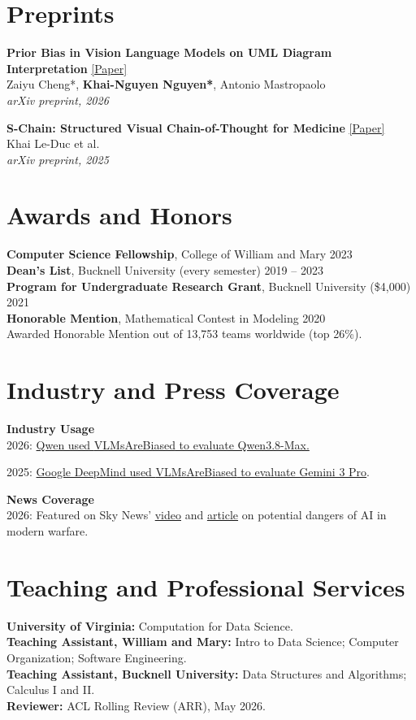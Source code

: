 \documentclass[11pt,a4paper]{article}
\newcommand{\pub}[5][]{%
  \if\relax\detokenize{#1}\relax
    \item
  \else
    \item[#1]
  \fi
  \begin{minipage}[t]{\linewidth}
    \textbf{#2} #3\\#4\\\textit{#5}
  \end{minipage}
}
\begin{document}
\section{Preprints}
\begin{enumerate}[
    label={[P\arabic*]},
    leftmargin=28pt,
    itemsep=6pt,
    topsep=4pt,
    parsep=0pt
]
\pub{Prior Bias in Vision Language Models on UML Diagram Interpretation}
{\href{https://arxiv.org/abs/2607.02853}{[Paper]}}
{Zaiyu Cheng*, \textbf{Khai-Nguyen Nguyen*}, Antonio Mastropaolo}
{arXiv preprint, 2026}

\pub{S-Chain: Structured Visual Chain-of-Thought for Medicine}
{\href{https://arxiv.org/abs/2510.22728}{[Paper]}}
{Khai Le-Duc et al.}
{arXiv preprint, 2025}
\end{enumerate}

\section{Awards and Honors}
\textbf{Computer Science Fellowship}, College of William and Mary \hfill 2023\\
\textbf{Dean's List}, Bucknell University (every semester) \hfill 2019 -- 2023\\
\textbf{Program for Undergraduate Research Grant}, Bucknell University (\$4,000) \hfill 2021\\
\textbf{Honorable Mention}, Mathematical Contest in Modeling \hfill 2020\\
Awarded Honorable Mention out of 13,753 teams worldwide (top 26\%).
\section{Industry and Press Coverage}
\textbf{Industry Usage}\\
2026: \href{https://qwen.ai/blog?id=qwen3.8}{Qwen used {VLMsAreBiased} to evaluate Qwen3.8-Max.}

2025: \href{https://blog.google/innovation-and-ai/technology/developers-tools/gemini-3-pro-vision/}{Google DeepMind used {VLMsAreBiased} to evaluate Gemini 3 Pro}.

\textbf{News Coverage}\\
2026: Featured on Sky News'
\href{https://www.youtube.com/watch?v=BkRrO_4OCCc}{video}
and
\href{https://news.sky.com/story/ai-could-be-giving-us-lethal-edge-in-iran-war-but-there-are-dangers-13514784}{article}
on potential dangers of AI in modern warfare.

\section{Teaching and Professional Services}
\textbf{University of Virginia:} Computation for Data Science.\\
\textbf{Teaching Assistant, William and Mary:} Intro to Data Science; Computer Organization; Software Engineering.\\
\textbf{Teaching Assistant, Bucknell University:} Data Structures and Algorithms; Calculus I and II.\\
\textbf{Reviewer:} ACL Rolling Review (ARR), May 2026.
\end{document}
